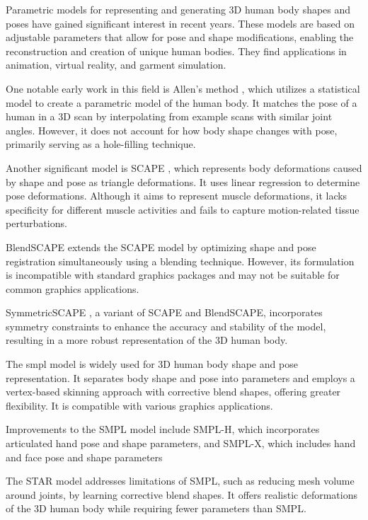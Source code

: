 Parametric models for representing and generating 3D human body shapes and
poses have gained significant interest in recent years. These models are based
on adjustable parameters that allow for pose and shape modifications, enabling
the reconstruction and creation of unique human bodies. They find applications
in animation, virtual reality, and garment simulation.

One notable early work in this field is Allen's method \cite{allen:2003}, which
utilizes a statistical model to create a parametric model of the human body. It
matches the pose of a human in a 3D scan by interpolating from example scans
with similar joint angles. However, it does not account for how body shape
changes with pose, primarily serving as a hole-filling technique.

Another significant model is SCAPE \cite{scape}, which represents body
deformations caused by shape and pose as triangle deformations. It uses linear
regression to determine pose deformations. Although it aims to represent muscle
deformations, it lacks specificity for different muscle activities and fails to
capture motion-related tissue perturbations.

BlendSCAPE \cite{blendscape} extends the SCAPE model by optimizing shape and
pose registration simultaneously using a blending technique. However, its
formulation is incompatible with standard graphics packages and may not be
suitable for common graphics applications.

SymmetricSCAPE \cite{CHEN201952}, a variant of SCAPE and BlendSCAPE,
incorporates symmetry constraints to enhance the accuracy and stability of the
model, resulting in a more robust representation of the 3D human body.

The \gls{smpl} \cite{SMPL:2015} model is widely used for 3D human body shape
and pose representation. It separates body shape and pose into parameters and
employs a vertex-based skinning approach with corrective blend shapes, offering
greater flexibility. It is compatible with various graphics applications.

Improvements to the SMPL model include SMPL-H, which incorporates articulated
hand pose and shape parameters, and SMPL-X, which includes hand and face pose
and shape parameters \cite{SMPL-X:2019}

The STAR model \cite{STAR:2020} addresses limitations of SMPL, such as reducing
mesh volume around joints, by learning corrective blend shapes. It offers
realistic deformations of the 3D human body while requiring fewer parameters
than SMPL.


